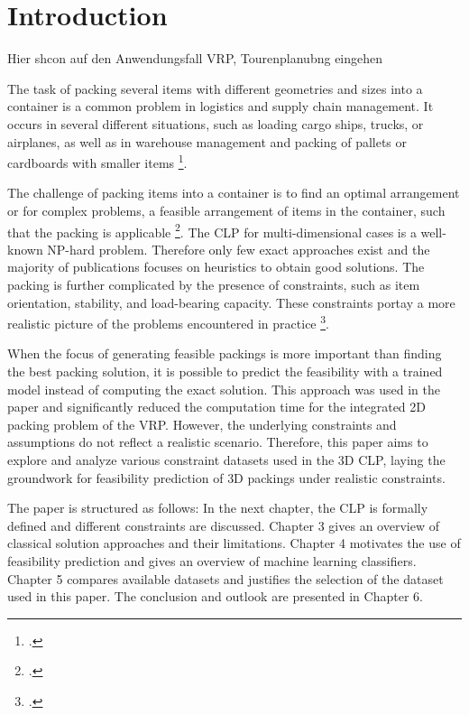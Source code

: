 \chapter{Introduction}

Hier shcon auf den Anwendungsfall VRP, Tourenplanubng eingehen

The task of packing several items with different geometries and sizes into a container
is a common problem in logistics and supply chain management. It occurs in several
different situations, such as loading cargo ships, trucks, or airplanes,
as well as in warehouse management and packing of pallets or cardboards with
smaller items \footcite[cf.][p.1]{bortfeldt_constraints_2013}.

The challenge of packing items into a container is to find an optimal arrangement or for
complex problems, a feasible arrangement of items in the container,
such that the packing is applicable \footcite[cf.][p.2-3]{tamke_branch-and-cut_2024}.
The \gls{CLP} for multi-dimensional cases is a well-known NP-hard problem. Therefore
only few exact approaches exist and the majority of publications focuses on
heuristics to obtain good solutions. The packing is further complicated by the presence
of constraints, such as item orientation, stability, and load-bearing capacity.
These constraints portay a more realistic picture of the problems encountered in practice
\footcite[cf.][p.377-378]{bischoff_issues_1995}.

When the focus of generating feasible packings is more important than finding the best
packing solution, it is possible to predict the feasibility with a trained model instead
of computing the exact solution. This approach was used in the paper \cite{zhang_learning-based_2022}
and significantly reduced the computation time for the integrated \gls{2D} packing problem
of the \gls{VRP}. However, the underlying constraints and assumptions do not reflect
a realistic scenario. Therefore, this paper aims to explore and analyze various
constraint datasets used in the \gls{3D} \gls{CLP}, laying the groundwork for feasibility
prediction of \gls{3D} packings under realistic constraints.

The paper is structured as follows: In the next chapter, the \gls{CLP} is formally defined
and different constraints are discussed. Chapter 3 gives an overview of classical solution
approaches and their limitations. Chapter 4 motivates the use of feasibility prediction
and gives an overview of machine learning classifiers. Chapter 5 compares available datasets
and justifies the selection of the dataset used in this paper. The conclusion and outlook
are presented in Chapter 6.

